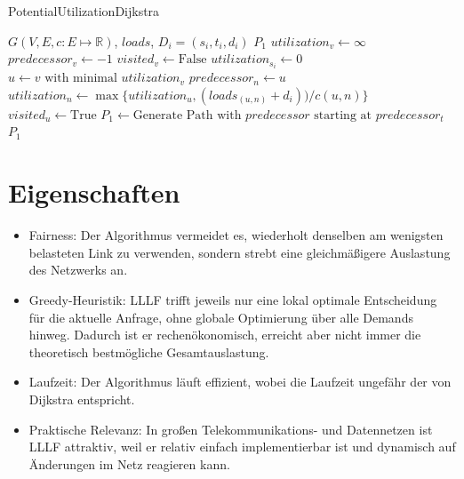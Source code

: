     \begin{algorithm}[H]
        \caption{PotentialUtilizationDijkstra}
        \label{alg:p_u_dijkstra}
        \begin{algorithmic}[1]
            \Require $G(V,E,c:E\mapsto\mathbb{R})$, $loads$, $D_i=(s_i,t_i,d_i)$
            \Ensure $P_1$
                \State $utilization_v \gets \infty$
                \State $predecessor_v \gets -1$
                \State $visited_v \gets \text{False}$
            \EndFor
            \State $utilization_{s_i} \gets 0$
                \State $u \gets v \text{ with minimal } utilization_v$
                        \State $predecessor_n \gets u$
                        \State $utilization_n \gets \max\{utilization_u,(loads_{(u,n)}+d_i))/c(u,n)\}$
                    \EndIf
                \EndFor
                \State $visited_u \gets \text{True}$
            \EndWhile
            \State $P_1 \gets \text{Generate Path with } predecessor \text{ starting at } predecessor_t$
            \State \Return $P_1$
        \end{algorithmic}
    \end{algorithm}

\section{Eigenschaften}

    \begin{itemize}
        \item Fairness: Der Algorithmus vermeidet es, wiederholt denselben am wenigsten belasteten Link zu verwenden, sondern strebt eine gleichmäßigere Auslastung des Netzwerks an.
        \item Greedy-Heuristik: LLLF trifft jeweils nur eine lokal optimale Entscheidung für die aktuelle Anfrage, ohne globale Optimierung über alle Demands hinweg. Dadurch ist er rechenökonomisch, erreicht aber nicht immer die theoretisch bestmögliche Gesamtauslastung.
        \item Laufzeit: Der Algorithmus läuft effizient, wobei die Laufzeit ungefähr der von Dijkstra entspricht.
        \item Praktische Relevanz: In großen Telekommunikations- und Datennetzen ist LLLF attraktiv, weil er relativ einfach implementierbar ist und dynamisch auf Änderungen im Netz reagieren kann.
    \end{itemize}

